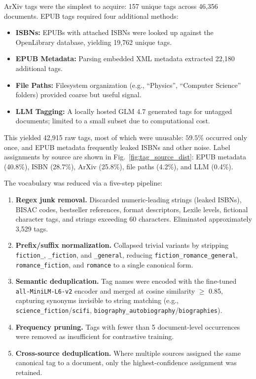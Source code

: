 \documentclass[10pt,journal,compsoc]{IEEEtran}
\newcommand{\ArXivDocs}{46,356}
\newcommand{\RawTags}{42,915}
\newcommand{\ISBNRawTags}{19,762}
\newcommand{\EPUBRawTags}{22,180}
\newcommand{\ArXivRawTags}{157}
\newcommand{\JunkTagsRemoved}{3,529}
\newcommand{\SingletonTagPct}{59.5}
\newcommand{\SimilarityThreshold}{0.85}
\newcommand{\FrequencyPruneMin}{5}
\newcommand{\TagsEPUBMetaPct}{40.8}
\newcommand{\TagsISBNPct}{28.7}
\newcommand{\TagsArXivPct}{25.8}
\newcommand{\TagsPathsPct}{4.2}
\newcommand{\TagsLLMPct}{0.4}
\newcommand{\TagMaxChars}{60}
\begin{document}
ArXiv tags were the simplest to acquire: \ArXivRawTags{} unique tags across \ArXivDocs{} documents. EPUB tags required four additional methods:

\begin{itemize}
	\item \textbf{ISBNs:} EPUBs with attached ISBNs were looked up against the OpenLibrary database, yielding \ISBNRawTags{} unique tags.
	\item \textbf{EPUB Metadata:} Parsing embedded XML metadata extracted \EPUBRawTags{} additional tags.
	\item \textbf{File Paths:} Filesystem organization (e.g., ``Physics'', ``Computer Science'' folders) provided coarse but useful signal.
	\item \textbf{LLM Tagging:} A locally hosted GLM 4.7 generated tags for untagged documents; limited to a small subset due to computational cost.
\end{itemize}

This yielded \RawTags{} raw tags, most of which were unusable: $\SingletonTagPct\%$ occurred only once, and EPUB metadata frequently leaked ISBNs and other noise. Label assignments by source are shown in Fig.\ \ref{fig:tag_source_dist}: EPUB metadata (\TagsEPUBMetaPct{}\%), ISBN (\TagsISBNPct{}\%), ArXiv (\TagsArXivPct{}\%), file paths (\TagsPathsPct{}\%), and LLM (\TagsLLMPct{}\%).

The vocabulary was reduced via a five-step pipeline:

\begin{enumerate}
	\item \textbf{Regex junk removal.} Discarded numeric-leading strings (leaked ISBNs), BISAC codes, bestseller references, format descriptors, Lexile levels, fictional character tags, and strings exceeding \TagMaxChars{} characters. Eliminated approximately \JunkTagsRemoved{} tags.
	\item \textbf{Prefix/suffix normalization.} Collapsed trivial variants by stripping \texttt{fiction\_}, \texttt{\_fiction}, and \texttt{\_general}, reducing \texttt{fiction\_romance\_general}, \texttt{romance\_fiction}, and \texttt{romance} to a single canonical form.
	\item \textbf{Semantic deduplication.} Tag names were encoded with the fine-tuned \texttt{all-MiniLM-L6-v2} encoder and merged at cosine similarity $\geq$ \SimilarityThreshold{}, capturing synonyms invisible to string matching (e.g., \texttt{science\_fiction}/\texttt{scifi}, \texttt{biography\_autobiography}/\texttt{biographies}).
	\item \textbf{Frequency pruning.} Tags with fewer than \FrequencyPruneMin{} document-level occurrences were removed as insufficient for contrastive training.
	\item \textbf{Cross-source deduplication.} Where multiple sources assigned the same canonical tag to a document, only the highest-confidence assignment was retained.
\end{enumerate}
\end{document}
